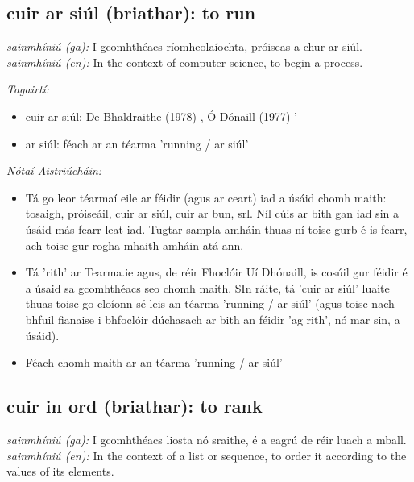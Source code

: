 \documentclass{article}
\begin{document}
\subsection*{cuir ar siúl (briathar): to run} 
 \noindent \textit{sainmhíniú (ga):} I gcomhthéacs ríomheolaíochta, próiseas a chur ar siúl.
\newline\newline
 \noindent \textit{sainmhíniú (en):} In the context of computer science, to begin a process.
\newline

 \noindent \textit{Tagairtí:}
\begin{itemize}
	\item cuir ar siúl: De Bhaldraithe (1978) \cite{de-bhaldraithe}, Ó Dónaill (1977) \cite{odonaill}'
	\item ar siúl: féach ar an téarma 'running / ar siúl'
\end{itemize}

 \noindent \textit{Nótaí Aistriúcháin:}
\begin{itemize}
	\item Tá go leor téarmaí eile ar féidir (agus ar ceart) iad a úsáid chomh maith: tosaigh, próiseáil, cuir ar siúl, cuir ar bun, srl. Níl cúis ar bith gan iad sin a úsáid más fearr leat iad. Tugtar sampla amháin thuas ní toisc gurb é is fearr, ach toisc gur rogha mhaith amháin atá ann.
	\item Tá 'rith' ar Tearma.ie agus, de réir Fhoclóir Uí Dhónaill, is cosúil gur féidir é a úsaid sa gcomhthéacs seo chomh maith. SIn ráite, tá 'cuir ar siúl' luaite thuas toisc go cloíonn sé leis an téarma 'running / ar siúl' (agus toisc nach bhfuil fianaise i bhfoclóir dúchasach ar bith an féidir 'ag rith', nó mar sin, a úsáid).
	\item Féach chomh maith ar an téarma 'running / ar siúl'
\end{itemize}


\subsection*{cuir in ord (briathar): to rank} 
 \noindent \textit{sainmhíniú (ga):} I gcomhthéacs liosta nó sraithe, é a eagrú de réir luach a mball.
\newline\newline
 \noindent \textit{sainmhíniú (en):} In the context of a list or sequence, to order it according to the values of its elements.
\newline
\end{document}
